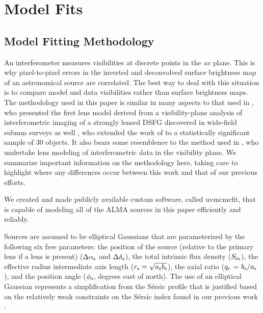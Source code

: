 \documentclass[iop]{emulateapj}
\begin{document}



%

\section{Model Fits}\label{sec:modelfits}

\subsection{Model Fitting Methodology}\label{sec:modelfitsmeth}

An interferometer measures visibilities at discrete points in the {\it uv}
plane.  This is why pixel-to-pixel errors in the inverted and deconvolved
surface brightness map of an astronomical source are correlated.  The best way
to deal with this situation is to compare model and data visibilities rather
than surface brightness maps.  The methodology used in this paper is similar in
many aspects to that used in \citet{Bussmann:2012lr}, who presented the first
lens model derived from a visibility-plane analysis of interferometric imaging
of a strongly lensed DSFG discovered in wide-field submm surveys as well
\citet{Bussmann:2013lr}, who extended the work of \citet{Bussmann:2012lr} to a
statistically significant sample of 30 objects.  It also bears some resemblence
to the method used in \citet{Hezaveh:2013fk}, who undertake lens modeling of
interferometric data in the visibility plane.  We summarize important
information on the methodology here, taking care to highlight where any
differences occur between this work and that of our previous efforts.

We created and made publicly available custom software, called {\sc uvmcmcfit},
that is capable of modeling all of the ALMA sources in this paper efficiently
and reliably.  

Sources are assumed to be elliptical Gaussians that are parameterized by the
following six free parameters: the position of the source (relative to the
primary lens if a lens is present) ($\Delta \alpha_{\rm s}$ and $\Delta
\delta_{\rm s}$), the total intrinsic flux density ($S_{\rm in}$), the
effective radius intermediate axis length ($r_{\rm s} = \sqrt{a_{\rm s} b_{\rm
s}}$), the axial ratio ($q_{\rm s}$ =  $b_{\rm s}/a_{\rm s}$), and the position
angle ($\phi_{\rm s}$, degrees east of north).  The use of an elliptical
Gaussian represents a simplification from the S\'ersic profile
\citep{1968adga.book.....S}  that is justified based on the relatively weak
constraints on the S\'ersic index found in our previous work
\citep{Bussmann:2012lr, Bussmann:2013lr}.
\end{document}

